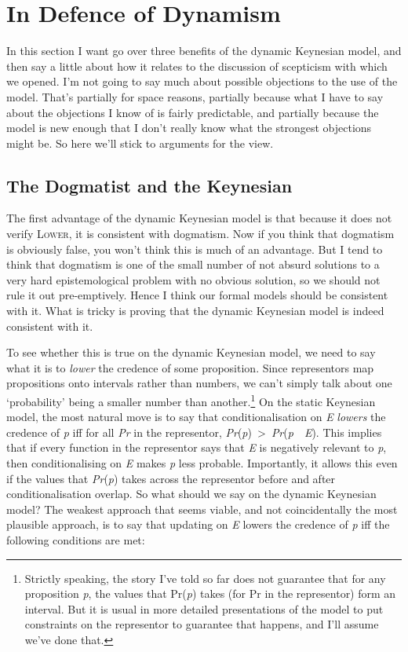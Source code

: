 \section{In Defence of Dynamism}

In this section I want go over three benefits of the dynamic Keynesian model, and then say a little about how it relates to the discussion of scepticism with which we opened. I'm not going to say much about possible objections to the use of the model. That's partially for space reasons, partially because what I have to say about the objections I know of is fairly predictable, and partially because the model is new enough that I don't really know what the strongest objections might be. So here we'll stick to arguments for the view. 


\subsection{The Dogmatist and the Keynesian}

The first advantage of the dynamic Keynesian model is that because it does not verify \textsc{Lower}, it is consistent with dogmatism. Now if you think that dogmatism is obviously false, you won't think this is much of an advantage. But I tend to think that dogmatism is one of the small number of not absurd solutions to a very hard epistemological problem with no obvious solution, so we should not rule it out pre-emptively. Hence I think our formal models should be consistent with it. What is tricky is proving that the dynamic Keynesian model is indeed consistent with it.

To see whether this is true on the dynamic Keynesian model, we need to say what it is to \textit{lower} the credence of some proposition. Since representors map propositions onto intervals rather than numbers, we can't simply talk about one `probability' being a smaller number than another.\footnote{ Strictly speaking, the story I've told so far does not guarantee that for any proposition \textit{p}, the values that Pr(\textit{p}) takes (for Pr in the representor) form an interval. But it is usual in more detailed presentations of the model to put constraints on the representor to guarantee that happens, and I'll assume we've done that.} On the static Keynesian model, the most natural move is to say that conditionalisation on \textit{E} \textit{lowers} the credence of \textit{p} iff for all \textit{Pr} in the representor, \textit{Pr}(\textit{p})~{\textgreater}~\textit{Pr}(\textit{p}~{\textbar}~\textit{E}). This implies that if every function in the representor says that \textit{E} is negatively relevant to \textit{p}, then conditionalising on \textit{E} makes \textit{p} less probable. Importantly, it allows this even if the values that \textit{Pr}(\textit{p}) takes across the representor before and after conditionalisation overlap. So what should we say on the dynamic Keynesian model? The weakest approach that seems viable, and not coincidentally the most plausible approach, is to say that updating on \textit{E} lowers the credence of \textit{p} iff the following conditions are met:


